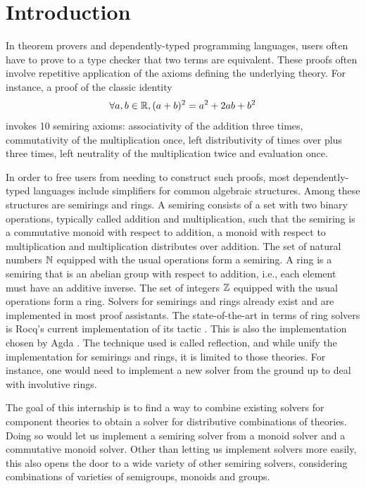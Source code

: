 \section{Introduction}
\label{sec:intro}

In theorem provers and dependently-typed programming languages, users often have to prove to a type checker that two terms are equivalent. These proofs often involve repetitive application of the axioms defining the underlying theory. For instance, a proof of the classic identity $$\forall a, b \in \mathbb R, (a + b)^2 = a^2 + 2ab + b^2$$ invokes 10 semiring axioms: associativity of the addition three times, commutativity of the multiplication once, left distributivity of times over plus three times, left neutrality of the multiplication twice and evaluation once.

In order to free users from needing to construct such proofs, most dependently-typed languages include simplifiers for common algebraic structures. Among these structures are semirings and rings. A semiring consists of a set with two binary operations, typically called addition and multiplication, such that the semiring is a commutative monoid with respect to addition, a monoid with respect to multiplication and multiplication distributes over addition. The set of natural numbers $\mathbb N$ equipped with the usual operations form a semiring. A ring is a semiring that is an abelian group with respect to addition, i.e., each element must have an additive inverse. The set of integers $\mathbb Z$ equipped with the usual operations form a ring. Solvers for semirings and rings already exist and are implemented in most proof assistants. The state-of-the-art in terms of ring solvers is Rocq's current implementation of its \ring tactic \parencite{coq_ring}. This is also the implementation chosen by Agda \parencite{agda_solver}. The technique used is called reflection, and while \citeauthor{coq_ring} unify the implementation for semirings and rings, it is limited to those theories. For instance, one would need to implement a new solver from the ground up to deal with involutive rings.

The goal of this internship is to find a way to combine existing solvers for component theories to obtain a solver for distributive combinations of theories. Doing so would let us implement a semiring solver from a monoid solver and a commutative monoid solver. Other than letting us implement solvers more easily, this also opens the door to a wide variety of other semiring solvers, considering combinations of varieties of semigroups, monoids and groups.

